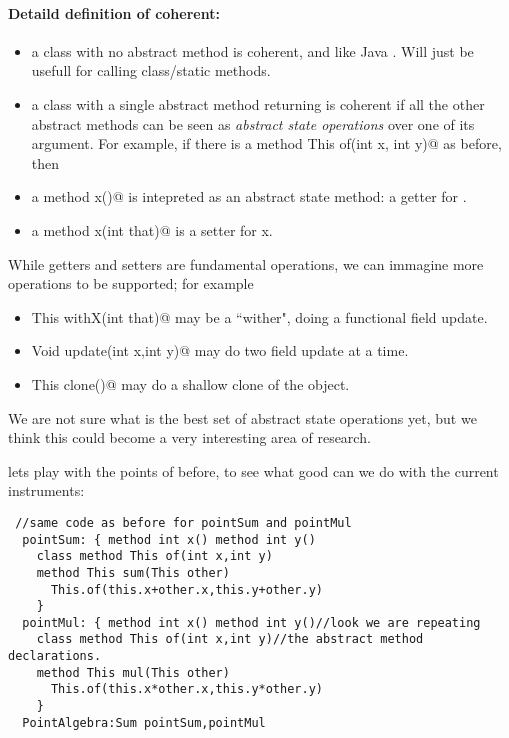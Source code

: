 \paragraph*{Detaild definition of coherent:}
\begin{itemize}
\item a class with no abstract method is coherent, and like Java \Q@Math@.
Will just be usefull for calling class/static methods.
\item a class with a single abstract \Q@class@ method returning \Q@This@
is coherent if all the other abstract methods can be seen as \emph{abstract state
operations} over one of its argument.
For example,
if there is a \Q@class method This of(int x, int y)@ as before,
then
\item a method \Q@int x()@ is intepreted as an abstract state method: a getter for \Q@x@.
\item a method \Q@Void x(int that)@ is a setter for x.
\end{itemize}

While getters and setters are fundamental operations, we can immagine
more operations to be supported; for example
\begin{itemize}
\item \Q@method This withX(int that)@
may be a ``wither", doing a functional field update.
\item \Q@method Void update(int x,int y)@
may do two field update at a time.
\item\Q@method This clone()@ may do a shallow clone of the object.
\end{itemize}

We are not sure what is the best set of abstract state operations yet, but we think this could become a very interesting area of research.
  
  
  lets play with the points of before, to see what good can we do with the current
  instruments:

\begin{lstlisting}
 //same code as before for pointSum and pointMul
  pointSum: { method int x() method int y()
    class method This of(int x,int y)
    method This sum(This other)
      This.of(this.x+other.x,this.y+other.y)
    }
  pointMul: { method int x() method int y()//look we are repeating
    class method This of(int x,int y)//the abstract method declarations.
    method This mul(This other)
      This.of(this.x*other.x,this.y*other.y)
    }
  PointAlgebra:Sum pointSum,pointMul
\end{lstlisting}  

